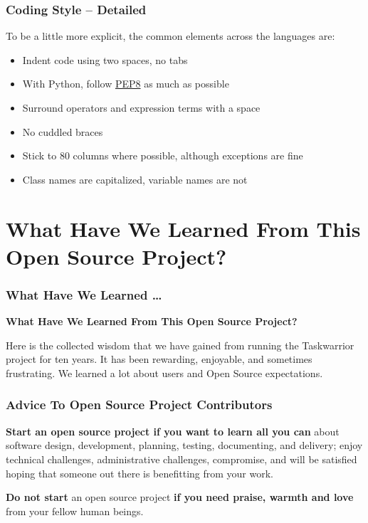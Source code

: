\documentclass[t,handout]{beamer}
\begin{document}
\begin{frame}[fragile]\frametitle{Coding Style -- Detailed}
    To be a little more explicit, the common elements across the languages are:

    \begin{itemize}
        \item Indent code using two spaces, no tabs
        \item With Python, follow \href{https://www.python.org/dev/peps/pep-0008/}{PEP8} as much as possible
        \item Surround operators and expression terms with a space
        \item No cuddled braces
        \item Stick to 80 columns where possible, although exceptions are fine
        \item Class names are capitalized, variable names are not
    \end{itemize}
\end{frame}

\section{What Have We Learned From This Open Source Project?}

\begin{frame}[fragile]\frametitle{What Have We Learned \ldots}
    \vfill
    \textbf{What Have We Learned From This Open Source Project?}

    Here is the collected wisdom that we have gained from running the Taskwarrior project for ten years. It has been rewarding, enjoyable, and sometimes frustrating. We learned a lot about users and Open Source expectations.
    \vfill
\end{frame}

\begin{frame}[fragile]\frametitle{Advice To Open Source Project Contributors}
    \vfill
    \textbf{Start an open source project if you want to learn all you can} about software design, development, planning, testing, documenting, and delivery; enjoy technical challenges, administrative challenges, compromise, and will be satisfied hoping that someone out there is benefitting from your work.

    \textbf{Do not start} an open source project \textbf{if you need praise, warmth and love} from your fellow human beings.
    \vfill
\end{frame}
\end{document}
